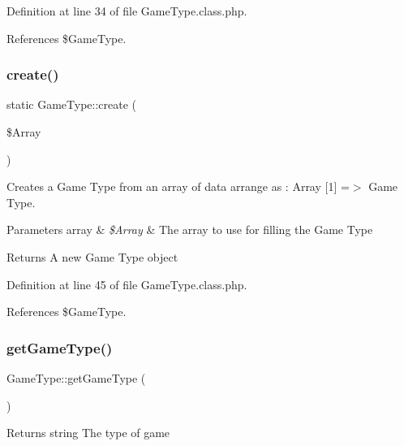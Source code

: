 Definition at line 34 of file Game\+Type.\+class.\+php.



References \$\+Game\+Type.

\mbox{\label{class_game_type_ad06317c8391fbd14723cb4e2d50cd98a}} 
\subsubsection{\texorpdfstring{create()}{create()}}
{\footnotesize\ttfamily static Game\+Type\+::create (\begin{DoxyParamCaption}\item[{}]{\$\+Array }\end{DoxyParamCaption})\hspace{0.3cm}{\ttfamily [static]}}



Creates a Game Type from an array of data arrange as \+: Array \mbox{[}1\mbox{]} =$>$ Game Type. 


\begin{DoxyParams}[1]{Parameters}
array & {\em \$\+Array} & The array to use for filling the Game Type \\
\hline
\end{DoxyParams}
\begin{DoxyReturn}{Returns}
A new Game Type object 
\end{DoxyReturn}


Definition at line 45 of file Game\+Type.\+class.\+php.



References \$\+Game\+Type.

\mbox{\label{class_game_type_a533811f34eea98ef686d1f423568c695}} 
\subsubsection{\texorpdfstring{get\+Game\+Type()}{getGameType()}}
{\footnotesize\ttfamily Game\+Type\+::get\+Game\+Type (\begin{DoxyParamCaption}{ }\end{DoxyParamCaption})}

\begin{DoxyReturn}{Returns}
string The type of game 
\end{DoxyReturn}


